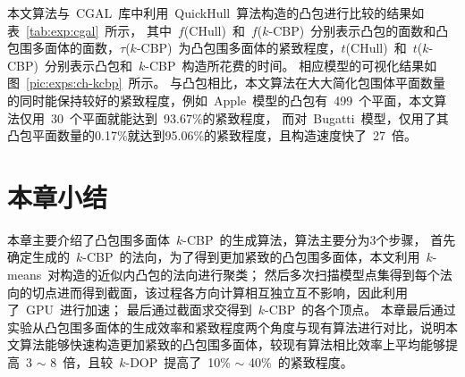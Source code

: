 本文算法与~CGAL~库中利用~QuickHull~算法构造的凸包进行比较的结果如表~\ref{tab:exp:cgal}~所示，
其中~$f$(CHull)~和~$f$($k$-CBP)~分别表示凸包的面数和凸包围多面体的面数，$\tau$($k$-CBP)~为凸包围多面体的紧致程度，$t$(CHull)~和~$t$($k$-CBP)~分别表示凸包和~$k$-CBP~构造所花费的时间。
相应模型的可视化结果如图~\ref{pic:exps:ch-kcbp}~所示。
与凸包相比，本文算法在大大简化包围体平面数量的同时能保持较好的紧致程度，例如~Apple~模型的凸包有~499~个平面，本文算法仅用~30~个平面就能达到~93.67\%的紧致程度，
而对~Bugatti~模型，仅用了其凸包平面数量的0.17\%就达到95.06\%的紧致程度，且构造速度快了~27~倍。

\FloatBarrier
\section{本章小结}
\label{sec:chap02:summary}

本章主要介绍了凸包围多面体~$k$-CBP~的生成算法，算法主要分为3个步骤，
首先确定生成的~$k$-CBP~的法向，为了得到更加紧致的凸包围多面体，本文利用~$k$-means~对构造的近似内凸包的法向进行聚类；
然后多次扫描模型点集得到每个法向的切点进而得到截面，该过程各方向计算相互独立互不影响，因此利用了~GPU~进行加速；
最后通过截面求交得到~$k$-CBP~的各个顶点。
本章最后通过实验从凸包围多面体的生成效率和紧致程度两个角度与现有算法进行对比，说明本文算法能够快速构造更加紧致的凸包围多面体，较现有算法相比效率上平均能够提高~3 $\sim$ 8~倍，且较~$k$-DOP~提高了~10\% $\sim$ 40\%~的紧致程度。

